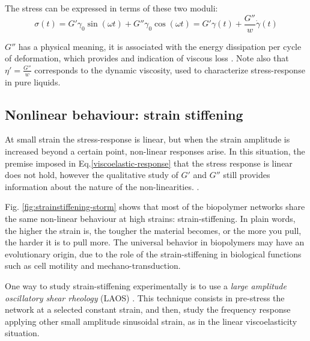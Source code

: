 The stress can be expressed in terms of these two moduli:
\begin{equation}\label{viscoelastic-stress-G}
\sigma(t) = G'\gamma_0 \sin(\omega t) + G''\gamma_0\cos(\omega t) = G'\gamma(t)
 + \frac{G''}{w}\dot{\gamma}(t)
\end{equation}

$G''$ has a physical meaning, it is associated with the energy dissipation
per cycle of deformation, which provides and indication of viscous
loss \citep{macosko_rheology:_1994}. Note also that $\eta'=\frac{G''}{w}$
corresponds to the dynamic viscosity, used to characterize stress-response in pure liquids.

\subsection{Nonlinear behaviour: strain stiffening}
\label{intro-strainstiffening}
At small strain the stress-response is linear, but when the strain amplitude is
increased beyond a certain point, non-linear responses arise. In this situation,
the premise imposed in Eq.\ref{viscoelastic-response} that the stress response is linear does not
hold, however the qualitative study of $G'$ and $G''$ still provides information
about the nature of the non-linearities.
\citep{carrillo_nonlinear_2013,mackintosh_elasticity_1995,sheinman_nonlinear_2012,storm_nonlinear_2005,yao_nonlinear_2011}.

Fig. \ref{fig:strainstiffening-storm} shows that most of the biopolymer networks
share the same non-linear behaviour at high strains: strain-stiffening. In plain
words, the higher the strain is, the tougher the material becomes, or the more you pull,
the harder it is to pull more. The universal behavior in
biopolymers may have an evolutionary origin, due to the role of the strain-stiffening in biological functions such as cell motility
and mechano-transduction.

One way to study strain-stiffening experimentally is to use a \emph{large
amplitude oscillatory shear rheology} (LAOS) \citep{hyun_review_2011}. This
technique consists in pre-stress the network at a selected constant strain, and
then, study the frequency response applying other small amplitude sinusoidal strain, as in the
linear viscoelasticity situation.



